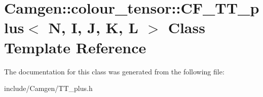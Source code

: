 \hypertarget{a00037}{}\section{Camgen\+:\+:colour\+\_\+tensor\+:\+:C\+F\+\_\+\+T\+T\+\_\+plus$<$ N, I, J, K, L $>$ Class Template Reference}
\label{a00037}


The documentation for this class was generated from the following file\+:\begin{DoxyCompactItemize}
\item 
include/\+Camgen/T\+T\+\_\+plus.\+h\end{DoxyCompactItemize}
